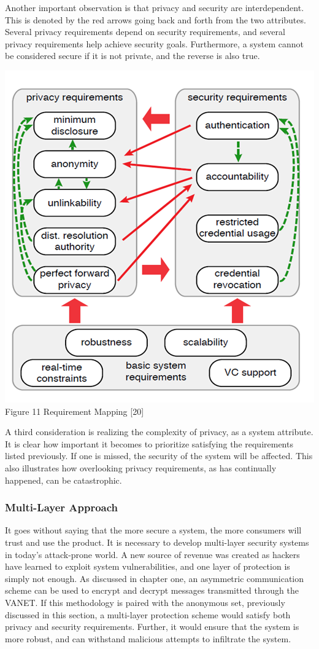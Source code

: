 \documentclass[conference,compsoc]{IEEEtran}
\begin{document}
Another important observation is that privacy and security are interdependent. This is denoted by the red arrows going back and forth from the two attributes. Several privacy requirements depend on security requirements, and several privacy requirements help achieve security goals. Furthermore, a system cannot be considered secure if it is not private, and the reverse is also true. 
\begin{center}
\includegraphics[scale = 1.05]{req.png}
\small{Figure 11 Requirement Mapping [20]}
\break
\end{center}
A third consideration is realizing the complexity of privacy, as a system attribute. It is clear how important it becomes to prioritize satisfying the requirements listed previously. If one is missed, the security of the system will be affected. This also illustrates how overlooking privacy requirements, as has continually happened, can be catastrophic. 

\subsubsection{Multi-Layer Approach}
It goes without saying that the more secure a system, the more consumers will trust and use the product. It is necessary to develop multi-layer security systems in today’s attack-prone world. A new source of revenue was created as hackers have learned to exploit system vulnerabilities, and one layer of protection is simply not enough. As discussed in chapter one, an asymmetric communication scheme can be used to encrypt and decrypt messages transmitted through the VANET. If this methodology is paired with the anonymous set, previously discussed in this section, a multi-layer protection scheme would satisfy both privacy and security requirements. Further, it would ensure that the system is more robust, and can withstand malicious attempts to infiltrate the system.
\end{document}
